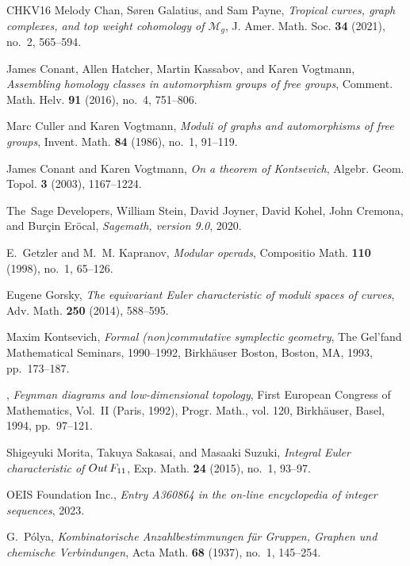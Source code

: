 \documentclass[oneside]{amsart}
\theoremstyle{remark}
\begin{document}
\begin{thebibliography}{CHKV16}
Melody Chan, S{\o}ren Galatius, and Sam Payne, \emph{Tropical curves, graph
  complexes, and top weight cohomology of {$\mathcal{M}_g$}}, J. Amer. Math.
  Soc. \textbf{34} (2021), no.~2, 565--594. 

James Conant, Allen Hatcher, Martin Kassabov, and Karen Vogtmann,
  \emph{Assembling homology classes in automorphism groups of free groups},
  Comment. Math. Helv. \textbf{91} (2016), no.~4, 751--806. 

Marc Culler and Karen Vogtmann, \emph{Moduli of graphs and automorphisms of
  free groups}, Invent. Math. \textbf{84} (1986), no.~1, 91--119. 

James Conant and Karen Vogtmann, \emph{On a theorem of {K}ontsevich}, Algebr.
  Geom. Topol. \textbf{3} (2003), 1167--1224. 

The~Sage Developers, William Stein, David Joyner, David Kohel, John Cremona,
  and Burçin Eröcal, \emph{Sagemath, version 9.0}, 2020.

E.~Getzler and M.~M. Kapranov, \emph{Modular operads}, Compositio Math.
  \textbf{110} (1998), no.~1, 65--126. 

Eugene Gorsky, \emph{The equivariant {E}uler characteristic of moduli spaces of
  curves}, Adv. Math. \textbf{250} (2014), 588--595. 

Maxim Kontsevich, \emph{Formal (non)commutative symplectic geometry}, The
  {G}el'fand {M}athematical {S}eminars, 1990--1992, Birkh\"auser Boston,
  Boston, MA, 1993, pp.~173--187. 

\bysame, \emph{Feynman diagrams and low-dimensional topology}, First {E}uropean
  {C}ongress of {M}athematics, {V}ol.\ {II} ({P}aris, 1992), Progr. Math., vol.
  120, Birkh\"auser, Basel, 1994, pp.~97--121. 

Shigeyuki Morita, Takuya Sakasai, and Masaaki Suzuki, \emph{Integral {E}uler
  characteristic of {${\rm Out}\,F_{11}$}}, Exp. Math. \textbf{24} (2015),
  no.~1, 93--97. 

{OEIS Foundation Inc.}, \emph{Entry {A360864} in the on-line encyclopedia of
  integer sequences}, 2023.

G.~P\'olya, \emph{Kombinatorische {A}nzahlbestimmungen f\"ur {G}ruppen,
  {G}raphen und chemische {V}erbindungen}, Acta Math. \textbf{68} (1937),
  no.~1, 145--254. 


\end{thebibliography}
\end{document}
